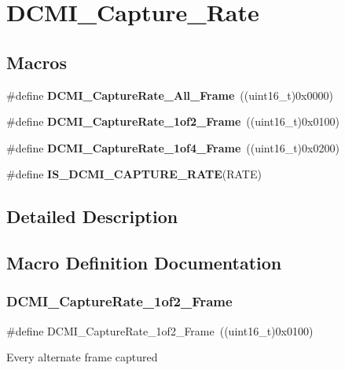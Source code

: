 \section{D\+C\+M\+I\+\_\+\+Capture\+\_\+\+Rate}
\label{group__DCMI__Capture__Rate}
\subsection*{Macros}
\begin{DoxyCompactItemize}
\item 
\#define \textbf{ D\+C\+M\+I\+\_\+\+Capture\+Rate\+\_\+\+All\+\_\+\+Frame}~((uint16\+\_\+t)0x0000)
\item 
\#define \textbf{ D\+C\+M\+I\+\_\+\+Capture\+Rate\+\_\+1of2\+\_\+\+Frame}~((uint16\+\_\+t)0x0100)
\item 
\#define \textbf{ D\+C\+M\+I\+\_\+\+Capture\+Rate\+\_\+1of4\+\_\+\+Frame}~((uint16\+\_\+t)0x0200)
\item 
\#define \textbf{ I\+S\+\_\+\+D\+C\+M\+I\+\_\+\+C\+A\+P\+T\+U\+R\+E\+\_\+\+R\+A\+TE}(R\+A\+TE)
\end{DoxyCompactItemize}


\subsection{Detailed Description}


\subsection{Macro Definition Documentation}
\mbox{\label{group__DCMI__Capture__Rate_ga9f89cbc2c2af326e029327603b2b5e78}} 
\subsubsection{D\+C\+M\+I\+\_\+\+Capture\+Rate\+\_\+1of2\+\_\+\+Frame}
{\footnotesize\ttfamily \#define D\+C\+M\+I\+\_\+\+Capture\+Rate\+\_\+1of2\+\_\+\+Frame~((uint16\+\_\+t)0x0100)}

Every alternate frame captured 

